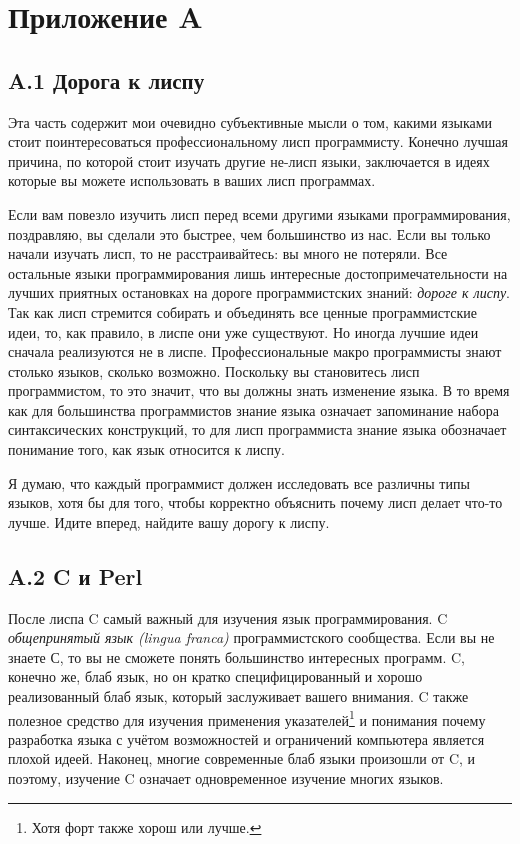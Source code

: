 \chapter*{Приложение A}

\section*{A.1 Дорога к лиспу}

Эта часть содержит мои очевидно субъективные мысли о том, какими языками стоит поинтересоваться профессиональному лисп программисту. Конечно лучшая причина, по которой стоит изучать другие не-лисп языки, заключается в идеях которые вы можете использовать в ваших лисп программах.

Если вам повезло изучить лисп перед всеми другими языками программирования, поздравляю, вы сделали это быстрее, чем большинство из нас. Если вы только начали изучать лисп, то не расстраивайтесь: вы много не потеряли. Все остальные языки программирования лишь интересные достопримечательности на лучших приятных остановках на дороге программистских знаний: \emph{дороге к лиспу}. Так как лисп стремится собирать и объединять все ценные программистские идеи, то, как правило, в лиспе они уже существуют. Но иногда лучшие идеи сначала реализуются не в лиспе. Профессиональные макро программисты знают столько языков, сколько возможно. Поскольку вы становитесь лисп программистом, то это значит, что вы должны знать изменение языка. В то время как для большинства программистов знание языка означает запоминание набора синтаксических конструкций, то для лисп программиста знание языка обозначает понимание того, как язык относится к лиспу.

Я думаю, что каждый программист должен исследовать все различны типы языков, хотя бы для того, чтобы корректно объяснить почему лисп делает что-то лучше. Идите вперед, найдите вашу дорогу к лиспу.

\section*{A.2 C и Perl}

После лиспа C самый важный для изучения язык программирования. C \emph{общепринятый язык (lingua franca)} программистского сообщества. Если вы не знаете С, то вы не сможете понять большинство интересных программ. C, конечно же, блаб язык, но он кратко специфицированный и хорошо реализованный блаб язык, который заслуживает вашего внимания. C также полезное средство для изучения применения указателей\footnote[1]{Хотя форт также хорош или лучше.} и понимания почему разработка языка с учётом возможностей и ограничений компьютера является плохой идеей. Наконец, многие современные блаб языки произошли от C, и поэтому, изучение C означает одновременное изучение многих языков.

